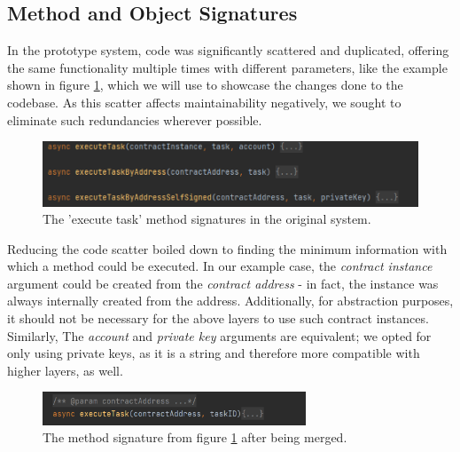 \subsection{Method and Object Signatures}
\label{sec:impr:enzian:sig}

In the prototype system, code was significantly scattered and duplicated, offering the same functionality multiple times with different parameters, like the example shown in figure \ref{fig:impr:enzian:sig-pre}, which we will use to showcase the changes done to the codebase. As this scatter affects maintainability negatively, we sought to eliminate such redundancies wherever possible.

\begin{figure}[h]
	\centering
	\captionsetup{justification=centering,margin=2cm}
	\includegraphics[width=\textwidth]{gfx/enzian-signatures-pre}
	\caption{The 'execute task' method signatures in the original system.}
	\label{fig:impr:enzian:sig-pre}
\end{figure}

Reducing the code scatter boiled down to finding the minimum information with which a method could be executed. In our example case, the \emph{contract instance} argument could be created from the \emph{contract address} - in fact, the instance was always internally created from the address. Additionally, for abstraction purposes, it should not be necessary for the above layers to use such contract instances. Similarly, The \emph{account} and \emph{private key} arguments are equivalent; we opted for only using private keys, as it is a string and therefore more compatible with higher layers, as well.

\begin{figure}[h]
	\centering
	\captionsetup{justification=centering,margin=2cm}
	\includegraphics[width=0.7\textwidth]{gfx/enzian-signatures-post}
	\caption{The method signature from figure \ref{fig:impr:enzian:sig-pre} after being merged.}
	\label{fig:impr:enzian:sig-post}
\end{figure}

